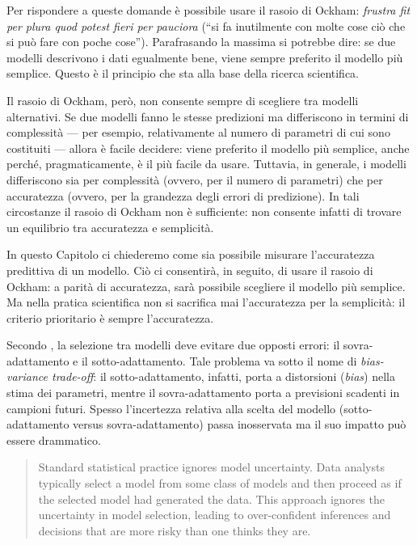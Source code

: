 \documentclass[
  10pt,
  italian,
  a4paper,
  extrafontsizes,onecolumn,openright
  ]{memoir}
\theoremstyle{definition}
\theoremstyle{definition}
\theoremstyle{definition}
\theoremstyle{definition}
\theoremstyle{remark}
\begin{document}
Per rispondere a queste domande è possibile usare il rasoio di Ockham: \emph{frustra fit per plura quod potest fieri per pauciora} (``si fa inutilmente con molte cose ciò che si può fare con poche cose''). Parafrasando la massima si potrebbe dire: se due modelli descrivono i dati egualmente bene, viene sempre preferito il modello più semplice. Questo è il principio che sta alla base della ricerca scientifica.

Il rasoio di Ockham, però, non consente sempre di scegliere tra modelli alternativi. Se due modelli fanno le stesse predizioni ma differiscono in termini di complessità --- per esempio, relativamente al numero di parametri di cui sono costituiti --- allora è facile decidere: viene preferito il modello più semplice, anche perché, pragmaticamente, è il più facile da usare. Tuttavia, in generale, i modelli differiscono sia per complessità (ovvero, per il numero di parametri) che per accuratezza (ovvero, per la grandezza degli errori di predizione). In tali circostanze il rasoio di Ockham non è sufficiente: non consente infatti di trovare un equilibrio tra accuratezza e semplicità.

In questo Capitolo ci chiederemo come sia possibile misurare l'accuratezza predittiva di un modello. Ciò ci consentirà, in seguito, di usare il rasoio di Ockham: a parità di accuratezza, sarà possibile scegliere il modello più semplice. Ma nella pratica scientifica non si sacrifica mai l'accuratezza per la semplicità: il criterio prioritario è sempre l'accuratezza.

Secondo \textcite{McElreath_rethinking}, la selezione tra modelli deve evitare due opposti errori: il sovra-adattamento e il sotto-adattamento. Tale problema va sotto il nome di \emph{bias-variance trade-off}: il sotto-adattamento, infatti, porta a distorsioni (\emph{bias}) nella stima dei parametri, mentre il sovra-adattamento porta a previsioni scadenti in campioni futuri. Spesso l'incertezza relativa alla scelta del modello (sotto-adattamento versus sovra-adattamento) passa inosservata ma il suo impatto può essere drammatico.

\begin{quote}
Standard statistical practice ignores model uncertainty. Data analysts typically select a model from some class of models and then proceed as if the selected model had generated the data. This approach ignores the uncertainty in model selection, leading to over-confident inferences and decisions that are more risky than one thinks they are. \autocite{hoeting1999bayesian}
\end{quote}
\end{document}
